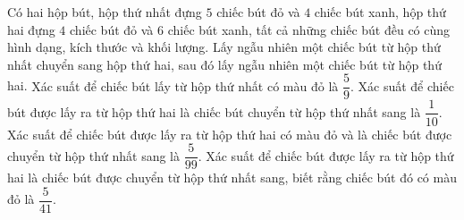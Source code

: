 \begin{ex}
Có hai hộp bút, hộp thứ nhất đựng $5$ chiếc bút đỏ và $4$ chiếc bút xanh, hộp thứ hai đựng $4$ chiếc bút đỏ và $6$ chiếc bút xanh, tất cả những chiếc bút đều có cùng hình dạng, kích thước và khối lượng. Lấy ngẫu nhiên một chiếc bút từ hộp thứ nhất chuyển sang hộp thứ hai, sau đó lấy ngẫu nhiên một chiếc bút từ hộp thứ hai.
\choiceTF
{\True Xác suất để chiếc bút lấy từ hộp thứ nhất có màu đỏ là $\dfrac59$.}
{Xác suất để chiếc bút được lấy ra từ hộp thứ hai là chiếc bút chuyển từ hộp thứ nhất sang là $\dfrac1{10}$.}
{\True Xác suất để chiếc bút được lấy ra từ hộp thứ hai có màu đỏ và là chiếc bút được chuyển từ hộp thứ nhất sang là $\dfrac5{99}$.}
{\True Xác suất để chiếc bút được lấy ra từ hộp thứ hai là chiếc bút được chuyển từ hộp thứ nhất sang, biết rằng chiếc bút đó có màu đỏ là $\dfrac5{41}$.}
\end{ex}
